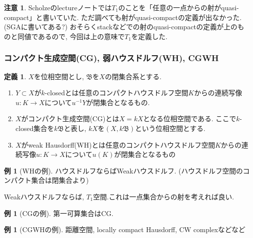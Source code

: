 \documentclass[dvipdfmx,a4paper,11pt]{article}
\theoremstyle{definition}
\newtheorem{dfn}[thm]{定義}
\newtheorem{rem}[thm]{注意}
\newtheorem{exa}[thm]{例}
\begin{document}
 \begin{rem}
 Scholzeのlectureノート\cite{Sch19}では$T_1$のことを「任意の一点からの射がquasi-compact」と書いていた.
 ただ調べても射がquasi-compactの定義が出なかった. (SGAに書いてある?)
 おそらくstackなどでの射のquasi-compactの定義が上のものと同値であるので, 今回は上の意味で$T_1$を定義した. 
 
 \end{rem}

\subsubsection{コンパクト生成空間(CG), 弱ハウスドルフ(WH), CGWH}


\begin{tcolorbox}
 [colback = white, colframe = green!35!black, fonttitle = \bfseries,breakable = true]
\begin{dfn}\cite[Definition 1.1 ,1.2]{Str}
$X$を位相空間とし, $\mathfrak{B}$を$X$の閉集合系とする. 
\begin{enumerate}
\item $Y \subset X$が$k$-closedとは任意のコンパクトハウスドルフ空間$K$からの連続写像$u : K \to X$について$u^{-1}Y$が閉集合となるもの. 
\item $X$がコンパクト生成空間(CG)とは$X = kX$となる位相空間である. ここで$k$-closed集合を$k\mathfrak{B}$と表し, $kX$を$(X, k\mathfrak{B})$という位相空間とする. 
\item $X$がweak Hausdorff(WH)とは任意のコンパクトハウスドルフ空間$K$からの連続写像$u : K \to X$について$u(K)$が閉集合となるもの
\end{enumerate}
\end{dfn}
\end{tcolorbox}

\begin{exa}[WHの例]
ハウスドルフならばWeakハウスドルフ. (ハウスドルフ空間のコンパクト集合は閉集合より)

Weakハウスドルフならば, $T_1$空間.これは一点集合からの射を考えれば良い.
\end{exa}

\begin{exa}[CGの例]
第一可算集合はCG. 
\end{exa}

\begin{exa}[CGWHの例]
距離空間, locally compact Hausdorff, CW complexなどなど
\end{exa}
\end{document}
